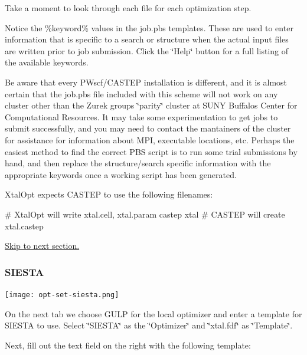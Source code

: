 Take a moment to look through each file for each optimization step.

Notice the \%keyword\% values in the job.\+pbs templates. These are used to enter information that is specific to a search or structure when the actual input files are written prior to job submission. Click the \char`\"{}\+Help\char`\"{} button for a full listing of the available keywords.

Be aware that every P\+Wscf/\+C\+A\+S\+T\+E\+P installation is different, and it is almost certain that the job.\+pbs file included with this scheme will not work on any cluster other than the Zurek group\textquotesingle{}s \char`\"{}parity\char`\"{} cluster at S\+U\+N\+Y Buffalo\textquotesingle{}s Center for Computational Resources. It may take some experimentation to get jobs to submit successfully, and you may need to contact the mantainers of the cluster for assistance for information about M\+P\+I, executable locations, etc. Perhaps the easiest method to find the correct P\+B\+S script is to run some trial submissions by hand, and then replace the structure/search specific information with the appropriate keywords once a working script has been generated.

Xtal\+Opt expects C\+A\+S\+T\+E\+P to use the following filenames\+:


\begin{DoxyCode}
\textcolor{preprocessor}{# XtalOpt will write xtal.cell, xtal.param}
castep xtal
\textcolor{preprocessor}{# CASTEP will create xtal.castep}
\end{DoxyCode}


\hyperlink{tut-xo_qisetup}{Skip to next section.}\hypertarget{tut-xo_siesta-opt}{}\subsubsection{S\+I\+E\+S\+T\+A}\label{tut-xo_siesta-opt}
 
\begin{DoxyImageNoCaption}
  \mbox{\texttt{[image: opt-set-siesta.png]}}
\end{DoxyImageNoCaption}


On the next tab we choose G\+U\+L\+P for the local optimizer and enter a template for S\+I\+E\+S\+T\+A to use. Select \char`\"{}\+S\+I\+E\+S\+T\+A\char`\"{} as the \char`\"{}\+Optimizer\char`\"{} and \char`\"{}xtal.\+fdf\char`\"{} as \char`\"{}\+Template\char`\"{}.

Next, fill out the text field on the right with the following template\+:


